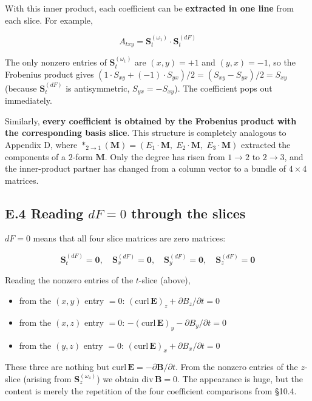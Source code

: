 With this inner product, each coefficient can be
\textbf{extracted in one line} from each slice. For example,

\[
A_{txy} = \mathbf{S}_{t}^{(\omega_1)} \cdot \mathbf{S}_{t}^{(dF)}
\]

The only nonzero entries of \(\mathbf{S}_{t}^{(\omega_1)}\) are
\((x,y)=+1\) and \((y,x)=-1\), so the Frobenius product gives
\((1 \cdot S_{xy} + (-1) \cdot S_{yx})/2 = (S_{xy} - S_{yx})/2 = S_{xy}\)
(because \(\mathbf{S}_{t}^{(dF)}\) is antisymmetric,
\(S_{yx}=-S_{xy}\)). The coefficient pops out immediately.

Similarly,
\textbf{every coefficient is obtained by the Frobenius product with the corresponding basis slice}.
This structure is completely analogous to Appendix D, where
\(\ast_{2\to1}(\mathbf{M}) = (E_1\!\cdot\!\mathbf{M},\;E_2\!\cdot\!\mathbf{M},\;E_3\!\cdot\!\mathbf{M})\)
extracted the components of a \(2\)-form \(\mathbf{M}\). Only the degree
has risen from \(1\to2\) to \(2\to3\), and the inner-product partner has
changed from a column vector to a bundle of \(4\times4\) matrices.

\hypertarget{e.4-reading-df0-through-the-slices}{%
\subsection{\texorpdfstring{E.4 Reading \(dF=0\) through the
slices}{E.4 Reading dF=0 through the slices}}\label{e.4-reading-df0-through-the-slices}}

\(dF=0\) means that all four slice matrices are zero matrices:

\[
\mathbf{S}_{t}^{(dF)} = \mathbf{0},\quad
\mathbf{S}_{x}^{(dF)} = \mathbf{0},\quad
\mathbf{S}_{y}^{(dF)} = \mathbf{0},\quad
\mathbf{S}_{z}^{(dF)} = \mathbf{0}
\]

Reading the nonzero entries of the \(t\)-slice (above),

\begin{itemize}
\item
  from the \((x,y)\) entry \(=0\):
  \((\mathrm{curl}\,\mathbf{E})_z + \partial B_z/\partial t = 0\)
\item
  from the \((x,z)\) entry \(=0\):
  \(-(\mathrm{curl}\,\mathbf{E})_y - \partial B_y/\partial t = 0\)
\item
  from the \((y,z)\) entry \(=0\):
  \((\mathrm{curl}\,\mathbf{E})_x + \partial B_x/\partial t = 0\)
\end{itemize}

These three are nothing but
\(\mathrm{curl}\,\mathbf{E} = -\partial\mathbf{B}/\partial t\). From the
nonzero entries of the \(z\)-slice (arising from
\(\mathbf{S}_{z}^{(\omega_4)}\)) we obtain
\(\mathrm{div}\,\mathbf{B} = 0\). The appearance is huge, but the
content is merely the repetition of the four coefficient comparisons
from §10.4.

